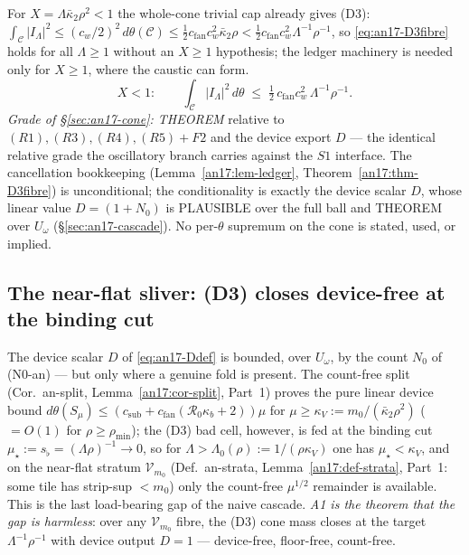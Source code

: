 \begin{remark}\label{an17:rem-smallX}
For $X=\Lambda\bar\kappa_2\rho^2<1$ the whole-cone trivial cap already gives (D3):
$\int_{\mathcal C}|I_\Lambda|^2\le(c_w/2)^2\,d\theta(\mathcal C)\le\tfrac12
c_{\mathrm{fan}}c_w^2\bar\kappa_2\rho<\tfrac12c_{\mathrm{fan}}c_w^2\Lambda^{-1}
\rho^{-1}$, so \eqref{eq:an17-D3fibre} holds for all $\Lambda\ge1$ without an
$X\ge1$ hypothesis; the ledger machinery is needed only for $X\ge1$, where the
caustic can form.
\begin{equation}\label{eq:an17-smallX}
 X<1:\qquad \int_{\mathcal C}|I_\Lambda|^2\,d\theta\;\le\;\tfrac12\,
 c_{\mathrm{fan}}c_w^2\,\Lambda^{-1}\rho^{-1}.
\end{equation}
\emph{Grade of \S\ref{sec:an17-cone}: {\rm THEOREM}} relative to
$(R1),(R3),(R4),(R5)+F2$ and the device export $D$ --- the identical relative
grade the oscillatory branch carries against the $S1$ interface. The cancellation
bookkeeping (Lemma~\ref{an17:lem-ledger}, Theorem~\ref{an17:thm-D3fibre}) is
unconditional; the conditionality is exactly the device scalar $D$, whose linear
value $D=(1+N_0)$ is PLAUSIBLE over the full ball and THEOREM over $U_\omega$
(\S\ref{sec:an17-cascade}). No per-$\theta$ supremum on the cone is stated, used,
or implied.
\end{remark}

\subsection{The near-flat sliver: (D3) closes device-free at the binding cut}
\label{sec:an17-A1}

The device scalar $D$ of \eqref{eq:an17-Ddef} is bounded, over $U_\omega$, by the
count $N_0$ of (N0-an) --- but only where a genuine fold is present. The
count-free split (Cor.~an-split, Lemma~\ref{an17:cor-split}, Part~1) proves the
pure linear device bound $d\theta(S_\mu)\le(c_{\mathrm{sub}}
+c_{\mathrm{fan}}(\mathcal R_0\kappa_b+2))\mu$ for $\mu\ge
\kappa_V:=m_0/(\bar\kappa_2\rho^2)$ ($=O(1)$ for $\rho\ge\rho_{\min}$); the (D3) bad cell, however, is fed at
the binding cut $\mu_\star:=s_\flat=(\Lambda\rho)^{-1}\to0$, so for $\Lambda>
\Lambda_0(\rho):=1/(\rho\kappa_V)$ one has $\mu_\star<\kappa_V$, and on the
near-flat stratum $\mathcal V_{m_0}$ (Def.~an-strata, Lemma~\ref{an17:def-strata},
Part~1: some tile has strip-sup $<m_0$) only the count-free
$\mu^{1/2}$ remainder is available. This is the last load-bearing gap of the naive
cascade. \emph{A1 is the theorem that the gap is harmless}: over any
$\mathcal V_{m_0}$ fibre, the (D3) cone mass closes at the target $\Lambda^{-1}
\rho^{-1}$ with device output $D=1$ --- device-free, floor-free, count-free.

